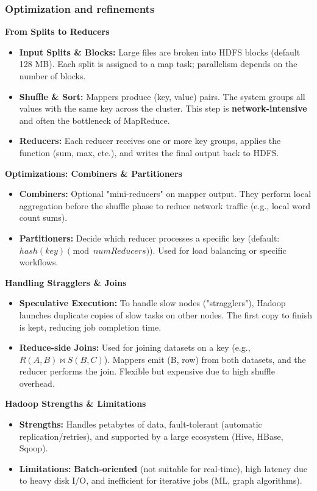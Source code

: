 \subsubsection{Optimization and refinements}

\textbf{From Splits to Reducers}
\begin{itemize}
    \item \textbf{Input Splits \& Blocks:} Large files are broken into HDFS blocks (default 128 MB). Each split is assigned to a map task; parallelism depends on the number of blocks.
    \item \textbf{Shuffle \& Sort:} Mappers produce (key, value) pairs. The system groups all values with the same key across the cluster. This step is \textbf{network-intensive} and often the bottleneck of MapReduce.
    \item \textbf{Reducers:} Each reducer receives one or more key groups, applies the function (sum, max, etc.), and writes the final output back to HDFS.
\end{itemize}



\textbf{Optimizations: Combiners \& Partitioners}
\begin{itemize}
    \item \textbf{Combiners:} Optional "mini-reducers" on mapper output. They perform local aggregation before the shuffle phase to reduce network traffic (e.g., local word count sums).
    \item \textbf{Partitioners:} Decide which reducer processes a specific key (default: $hash(key) \pmod{numReducers}$). Used for load balancing or specific workflows.
\end{itemize}



\textbf{Handling Stragglers \& Joins}
\begin{itemize}
    \item \textbf{Speculative Execution:} To handle slow nodes ("stragglers"), Hadoop launches duplicate copies of slow tasks on other nodes. The first copy to finish is kept, reducing job completion time.
    \item \textbf{Reduce-side Joins:} Used for joining datasets on a key (e.g., $R(A,B) \bowtie S(B,C)$). Mappers emit (B, row) from both datasets, and the reducer performs the join. Flexible but expensive due to high shuffle overhead.
\end{itemize}

\textbf{Hadoop Strengths \& Limitations}
\begin{itemize}
    \item \textbf{Strengths:} Handles petabytes of data, fault-tolerant (automatic replication/retries), and supported by a large ecosystem (Hive, HBase, Sqoop).
    \item \textbf{Limitations:} \textbf{Batch-oriented} (not suitable for real-time), high latency due to heavy disk I/O, and inefficient for iterative jobs (ML, graph algorithms).
\end{itemize}
